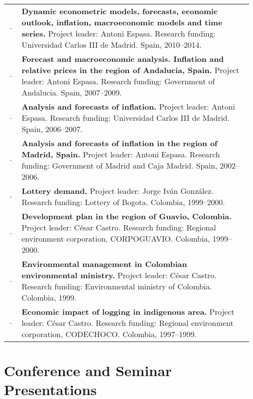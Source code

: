 \documentclass[11pt]{article}\usepackage[]{graphicx}\usepackage[]{color}
\begin{document}
\begin{tabular}{R{0.1cm} L{14cm}}

· & \textbf{Dynamic econometric models, forecasts, economic outlook, inflation, macroeconomic models and time series.} Project leader: Antoni Espasa. Research funding: Universidad Carlos III de Madrid. Spain, 2010--2014.\\[.2cm]

· & \textbf{Forecast and macroeconomic analysis. Inflation and relative prices in the region of Andalucia, Spain.} Project leader: Antoni Espasa. Research funding: Government of Andalucia. Spain, 2007--2009.\\[.2cm]

· & \textbf{Analysis and forecasts of inflation.} Project leader: Antoni Espasa. Research funding: Universidad Carlos III de Madrid. Spain, 2006--2007.\\[.cm]

· & \textbf{Analysis and forecasts of inflation in the region of Madrid, Spain.} Project leader: Antoni Espasa. Research funding: Government of Madrid and Caja Madrid. Spain, 2002--2006.\\[.2cm]

· & \textbf{Lottery demand.} Project leader: Jorge Iván González. Research funding: Lottery of Bogota. Colombia, 1999--2000.\\[.2cm]

· & \textbf{Development plan in the region of Guavio, Colombia.} Project leader: César Castro. Research funding: Regional environment corporation, CORPOGUAVIO. Colombia, 1999--2000.\\[.2cm]

· & \textbf{Environmental management in Colombian environmental ministry.} Project leader: César Castro. Research funding: Environmental ministry of Colombia. Colombia, 1999.\\[.2cm]

· & \textbf{Economic impact of logging in indigenous area.} Project leader: César Castro. Research funding: Regional environment corporation, CODECHOCO. Colombia, 1997--1999.\\

\end{tabular}


\section{Conference and Seminar Presentations} 
\end{document}
